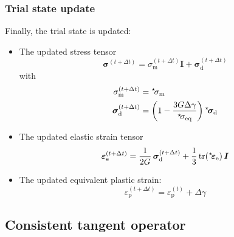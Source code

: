\documentclass[times,namecite]{goose-article}
\newcommand\leftstar[1]{\hspace*{-.3em}~^\star\!#1}
\begin{document}
\subsubsection{Trial state update}

Finally, the trial state is updated:
\begin{itemize}
%
\item The updated stress tensor
\begin{equation}
  \bm{\sigma}^{(t+\Delta t)}
  = \sigma_\mathrm{m}^{(t+\Delta t)} \bm{I} + \bm{\sigma}_\mathrm{d}^{(t+\Delta t)}
\end{equation}
with
\begin{align}
  \sigma_\mathrm{m}^{(t+\Delta t)}
  &=
  \leftstar{\sigma}_\mathrm{m}
  \\
  \bm{\sigma}_\mathrm{d}^{(t+\Delta t)}
  &=
  \left( 1 - \frac{3 G \Delta \gamma}{\leftstar{\sigma}_\mathrm{eq}} \right)
  \leftstar{\bm{\sigma}}_\mathrm{d}
\end{align}
%
\item The updated elastic strain tensor
\begin{equation}
  \bm{\varepsilon}_\mathrm{e}^{(t+\Delta t)}
  =
  \frac{1}{2G} \, \bm{\sigma}^{(t+\Delta t)}_\mathrm{d} +
  \frac{1}{3} \, \mathrm{tr} (\leftstar{\bm{\varepsilon}}_\mathrm{e}) \, \bm{I}
\end{equation}
%
\item The updated equivalent plastic strain:
\begin{equation}
  \varepsilon_\mathrm{p}^{(t+\Delta t)} = \varepsilon_\mathrm{p}^{(t)} + \Delta \gamma
\end{equation}
%
\end{itemize}

\subsection{Consistent tangent operator}
\end{document}
